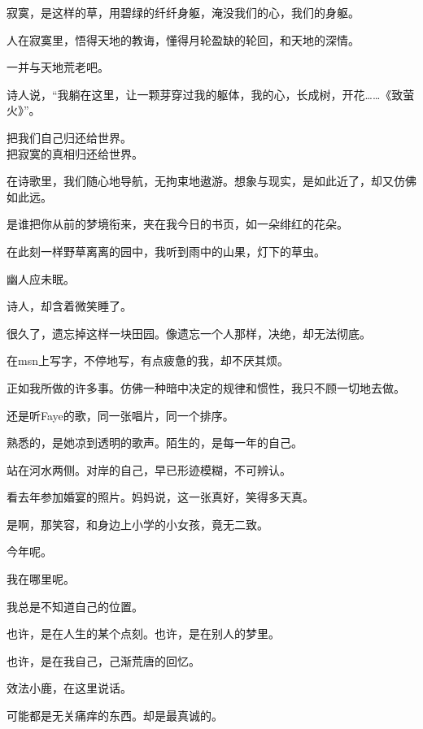 		\vspace{1em}
		寂寞，是这样的草，用碧绿的纤纤身躯，淹没我们的心，我们的身躯。\par
		人在寂寞里，悟得天地的教诲，懂得月轮盈缺的轮回，和天地的深情。\par
		一并与天地荒老吧。\par
		诗人说，“我躺在这里，让一颗芽穿过我的躯体，我的心，长成树，开花……《致萤火》”。

		\longpoem{}{}{}
			把我们自己归还给世界。\\
			把寂寞的真相归还给世界。
		\endlongpoem

		在诗歌里，我们随心地导航，无拘束地遨游。想象与现实，是如此近了，却又仿佛如此远。

		\vspace{1em}
		是谁把你从前的梦境衔来，夹在我今日的书页，如一朵绯红的花朵。\par
		在此刻一样野草离离的园中，我听到雨中的山果，灯下的草虫。\par
		幽人应未眠。\par
		诗人，却含着微笑睡了。

	\endwriting



		很久了，遗忘掉这样一块田园。像遗忘一个人那样，决绝，却无法彻底。\par
		在msn上写字，不停地写，有点疲惫的我，却不厌其烦。\par
		正如我所做的许多事。仿佛一种暗中决定的规律和惯性，我只不顾一切地去做。\par
		还是听Faye的歌，同一张唱片，同一个排序。\par
		熟悉的，是她凉到透明的歌声。陌生的，是每一年的自己。\par
		站在河水两侧。对岸的自己，早已形迹模糊，不可辨认。\par
		看去年参加婚宴的照片。妈妈说，这一张真好，笑得多天真。\par
		是啊，那笑容，和身边上小学的小女孩，竟无二致。\par
		今年呢。\par
		我在哪里呢。\par
		我总是不知道自己的位置。\par
		也许，是在人生的某个点刻。也许，是在别人的梦里。\par
		也许，是在我自己，己渐荒唐的回忆。

		\vspace{1em}
		效法小鹿，在这里说话。\par
		可能都是无关痛痒的东西。却是最真诚的。

